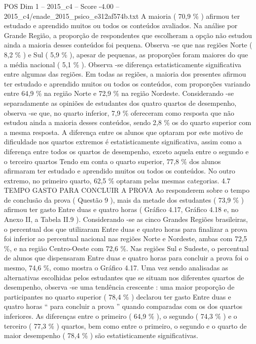 \begin{textsample}{POS Dim 1 – 2015\_c4 – Score -4.00 – 2015\_c4/enade\_2015\_psico\_e312af574b.txt}
A maioria ( 70,9 \% ) afirmou ter estudado e aprendido muitos ou todos os conteúdos avaliados.
Na análise por Grande Região, a proporção de respondentes que escolheram a opção não estudou ainda a maioria desses conteúdos foi pequena.
Observa -se que nas regiões Norte ( 8,2 \% ) e Sul ( 5,9 \% ), apesar de pequenas, as proporções foram maiores do que a média nacional ( 5,1 \% ).
Observa -se diferença estatisticamente significativa entre algumas das regiões.
Em todas as regiões, a maioria dos presentes afirmou ter estudado e aprendido muitos ou todos os conteúdos, com proporções variando entre 64,9 \% na região Norte e 72,9 \% na região Nordeste.
Considerando -se separadamente as opiniões de estudantes dos quatro quartos de desempenho, observa -se que, no quarto inferior, 7,9 \% ofereceram como resposta que não estudou ainda a maioria desses conteúdos, sendo 2,8 \% os do quarto superior com a mesma resposta.
A diferença entre os alunos que optaram por este motivo de dificuldade nos quartos extremos é estatisticamente significativa, assim como a diferença entre todos os quartos de desempenho, exceto aquela entre o segundo e o terceiro quartos Tendo em conta o quarto superior, 77,8 \% dos alunos afirmaram ter estudado e aprendido muitos ou todos os conteúdos.
No outro extremo, no primeiro quarto, 62,5 \% optaram pelas mesmas categorias. 4.7 TEMPO GASTO PARA CONCLUIR A PROVA Ao responderem sobre o tempo de conclusão da prova ( Questão 9 ), mais da metade dos estudantes ( 73,9 \% ) afirmou ter gasto Entre duas e quatro horas ( Gráfico 4.17, Gráfico 4.18 e, no Anexo II, a Tabela II.9 ).
Considerando -se as cinco Grandes Regiões brasileiras, o percentual dos que utilizaram Entre duas e quatro horas para finalizar a prova foi inferior ao percentual nacional nas regiões Norte e Nordeste, ambas com 72,5 \%, e na região Centro-Oeste com 72,6 \%.
Nas regiões Sul e Sudeste, o percentual de alunos que dispensaram Entre duas e quatro horas para concluir a prova foi o mesmo, 74,6 \%, como mostra o Gráfico 4.17.
Uma vez sendo analisadas as alternativas escolhidas pelos estudantes que se situam nos diferentes quartos de desempenho, observa -se uma tendência crescente : uma maior proporção de participantes no quarto superior ( 78,4 \% ) declarou ter gasto Entre duas e quatro horas “ para concluir a prova ” quando comparadas com os dos quartos inferiores.
As diferenças entre o primeiro ( 64,9 \% ), o segundo ( 74,3 \% ) e o terceiro ( 77,3 \% ) quartos, bem como entre o primeiro, o segundo e o quarto de maior desempenho ( 78,4 \% ) são estatisticamente significativas.

\end{textsample}
